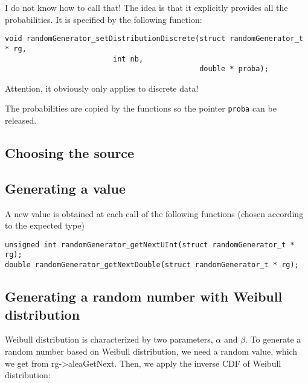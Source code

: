    I do not know how to call that! The idea is that it explicitly provides 
all the probabilities. It is specified by the following function:
   
\begin{verbatim}
void randomGenerator_setDistributionDiscrete(struct randomGenerator_t * rg,
					     int nb,
                                             double * proba);
\end{verbatim}
   
   Attention, it obviously only applies to discrete data!

   The probabilities are copied by the functions so the pointer
{\tt proba} can be released.

%
\subsection{Choosing the source}

%
\subsection{Generating a value}


   A new value is obtained at each call of the following functions 
(chosen according to the expected type)

\begin{verbatim}
unsigned int randomGenerator_getNextUInt(struct randomGenerator_t * rg);
double randomGenerator_getNextDouble(struct randomGenerator_t * rg);
\end{verbatim}

\subsection{Generating a random number with Weibull distribution}


Weibull distribution is characterized by two parameters, $\alpha$ and $\beta$.
To generate a random number based on Weibull distribution, we need a random value, which we get from rg->aleaGetNext. Then, we apply the inverse CDF of Weibull distribution:

